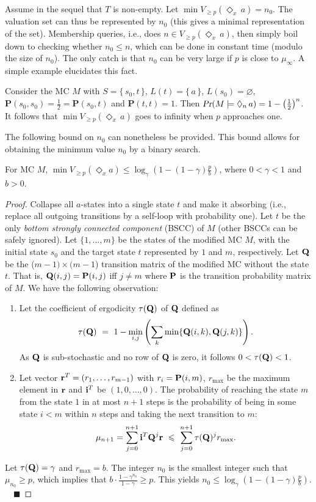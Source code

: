 \documentclass{llncs}
\renewcommand{\Pr}{\mbox{\rm Pr}}
\renewcommand{\Pr}{\mbox{\sl Pr}}
\def\bfP{\mathbf{P}}
\newcommand{\set}[1]{\{ \, #1 \, \}}
\renewcommand{\leq}{\leqslant}
\renewcommand{\geq}{\geqslant}
\renewcommand{\emptyset}{\varnothing}
\newcommand{\de}{\Diamond}
\begin{document}
Assume in the sequel that $T$ is non-empty.
Let $\min V_{\geq p}(\de_{x} \, a)=n_0$.
The valuation set can thus be represented by $n_0$ (this gives a minimal representation of the set).
Membership queries, i.e., does $n \in V_{\geq p}(\de_{x} \, a)$, then simply boil down to checking whether $n_0 \leq n$, 
which can be done in constant time (modulo the size of $n_0$).
The only catch is that $n_0$ can be very large if $p$ is  close to $\mu_\infty$. 
A simple example elucidates this fact.
\begin{example}
Consider the MC $M$ with $S = \set{s_0, t}$, $L(t) = \set{a}$, $L(s_0) = \emptyset$, $\bfP(s_0,s_0) = \frac{1}{2} = \bfP(s_0,t)$ and $\bfP(t,t) = 1$.
Then $\Pr(M \models \de_n \, a) = 1 - \left( \frac{1}{2} \right)^n$.
It follows that $\min V_{\geq p}(\de_x \, a)$ goes to infinity when $p$ approaches one.
\end{example}
The following bound on $n_0$ can nonetheless be provided.  
This bound allows for obtaining the minimum value $n_0$ by a binary search. 
\begin{proposition} For MC $M$,
 $\min V_{\geq p}(\Diamond_x a) \leq \log_\gamma (1 - (1-\gamma)\frac{p}{b})$, where $0<\gamma< 1$ and $b>0$. 
\end{proposition}
\begin{proof} 
Collapse all $a$-states into a single state $t$ and make it absorbing (i.e., replace all outgoing transitions by a self-loop with probability one). 
Let $t$ be the only \emph{bottom strongly connected component} (BSCC) of $M$ (other BSCCs can be safely ignored). 
Let $\{1,\hdots,m\}$ be the states of the modified MC $M$, with the initial state $s_0$ and the target state $t$  represented by $1$ and $m$, respectively.
Let $\bf Q$ be the ($m{-}1)\times (m{-}1$) transition matrix of the modified MC without the state $t$. 
That is, ${\bf Q}(i,j) = {\bf P}(i,j)$ iff $j\neq m$ where ${\bf P}$ is the transition probability matrix of $M$.
We have the following observation:
\begin{enumerate}
\item 
Let the coefficient of ergodicity $\tau({\bf Q})$ of ${\bf Q}$ defined as 
$$ \tau({\bf Q}) \ = \ 1-\displaystyle\min_{i,j} \left(\sum_k \min\{{\bf Q}(i,k),{\bf Q}(j,k)\} \right).$$ 
As $\bf Q$ is sub-stochastic and no row of $\bf Q$ is zero, it follows $0<\tau({\bf Q})<1$. 
\item 
Let vector ${\bf r}^T=(r_1,\hdots,r_{m{-}1})$ with $r_i = {\bf P}(i,m)$, $r_{\max}$ be the maximum element in ${\bf r}$ and ${\bf i}^T$ be $(1,0,\hdots,0)$.
The probability of reaching the state $m$ from the state $1$ in at most $n{+}1$ steps is the probability of being in some state $i<m$ within $n$ steps and taking the next transition to $m$: \vspace{-0.2cm}
$$ \mu_{n+1}  =  \sum_{j=0}^{n+1} {\bf i}^T{\bf Q}^j{\bf r} \ \leq \ \sum_{j=0}^{n+1} \tau({\bf Q})^j r_{\max}.$$
\end{enumerate}
Let $\tau({\bf Q}) = \gamma$ and $r_{\max}=b$. 
The integer $n_0$ is the smallest integer such that $\mu_{n_0} \geq p$, which implies
that $b{\cdot}\frac{1-\gamma^{n_0}}{1-\gamma} \geq p$.
This yields $n_0\leq \log_\gamma (1 - (1-\gamma)\frac{p}{b})$. \hfill $\quad\blacksquare$ 
\end{proof}
\end{document}
